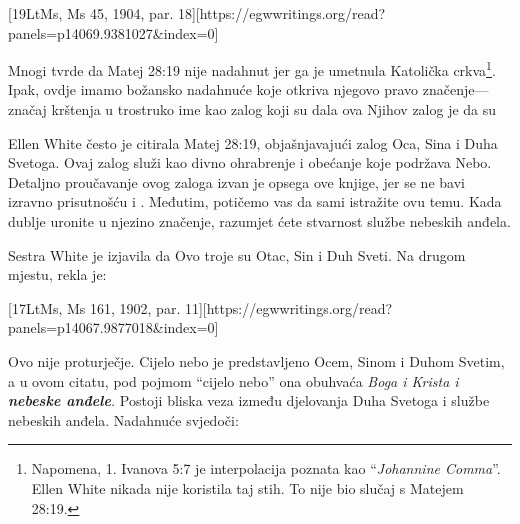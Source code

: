 [19LtMs, Ms 45, 1904, par. 18][https://egwwritings.org/read?panels=p14069.9381027&index=0]

Mnogi tvrde da Matej 28:19 nije nadahnut jer ga je umetnula Katolička crkva\footnote{Napomena, 1. Ivanova 5:7  je interpolacija poznata kao “\textit{Johannine Comma}”. Ellen White nikada nije koristila taj stih. To nije bio slučaj s Matejem 28:19.}. Ipak, ovdje imamo božansko nadahnuće koje otkriva njegovo pravo značenje—značaj krštenja u trostruko ime kao zalog koji su dala ova  Njihov zalog je da su 

Ellen White često je citirala Matej 28:19, objašnjavajući zalog Oca, Sina i Duha Svetoga. Ovaj zalog služi kao divno ohrabrenje i obećanje koje podržava Nebo. Detaljno proučavanje ovog zaloga izvan je opsega ove knjige, jer se ne bavi izravno prisutnošću i . Međutim, potičemo vas da sami istražite ovu temu. Kada dublje uronite u njezino značenje, razumjet ćete stvarnost službe nebeskih anđela.

Sestra White je izjavila da  Ovo troje su Otac, Sin i Duh Sveti. Na drugom mjestu, rekla je:

[17LtMs, Ms 161, 1902, par. 11][https://egwwritings.org/read?panels=p14067.9877018&index=0]

Ovo nije proturječje. Cijelo nebo je predstavljeno Ocem, Sinom i Duhom Svetim, a u ovom citatu, pod pojmom “cijelo nebo” ona obuhvaća \textit{Boga i Krista i \textbf{nebeske anđele}.} Postoji bliska veza između djelovanja Duha Svetoga i službe nebeskih anđela. Nadahnuće svjedoči:


